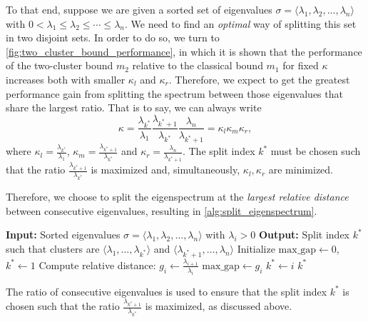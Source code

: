 To that end, suppose we are given a sorted set of eigenvalues $\sigma = \langle\lambda_1, \lambda_2, \ldots, \lambda_n\rangle$ with $0 < \lambda_1 \leq \lambda_2 \leq \cdots \leq \lambda_n$. We need to find an \textit{optimal} way of splitting this set in two disjoint sets. In order to do so, we turn to \cref{fig:two_cluster_bound_performance}, in which it is shown that the performance of the two-cluster bound $m_2$ relative to the classical bound $m_1$ for fixed $\kappa$ increases both with smaller $\kappa_l$ and $\kappa_r$. Therefore, we expect to get the greatest performance gain from splitting the spectrum between those eigenvalues that share the largest ratio. That is to say, we can always write
\[
    \kappa = \frac{\lambda_{k^*}}{\lambda_1}\frac{\lambda_{k^*+1}}{\lambda_{k^*}}\frac{\lambda_n}{\lambda_{k^*+1}} = \kappa_l\kappa_m\kappa_r,
\]
where $\kappa_l = \frac{\lambda_{k^*}}{\lambda_1}$, $\kappa_m = \frac{\lambda_{k^*+1}}{\lambda_{k^*}}$ and $\kappa_r = \frac{\lambda_n}{\lambda_{k^*+1}}$. The split index $k^*$ must be chosen such that the ratio $\frac{\lambda_{k^*+1}}{\lambda_{k^*}}$ is maximized and, simultaneously, $\kappa_l,\kappa_r$ are minimized.

Therefore, we choose to split the eigenspectrum at the \textit{largest relative distance} between consecutive eigenvalues, resulting in \cref{alg:split_eigenspectrum}.
\begin{algorithm}[H]
    \caption{$\operatorname{SplitEigenspectrum}(\sigma)$}
    \begin{algorithmic}[1]
        \State \textbf{Input:} Sorted eigenvalues $\sigma = \langle\lambda_1, \lambda_2, \ldots, \lambda_n\rangle$ with $\lambda_i > 0$
        \State \textbf{Output:} Split index $k^*$ such that clusters are $\langle\lambda_1, \ldots, \lambda_{k^*}\rangle$ and $\langle\lambda_{k^*+1}, \ldots, \lambda_n\rangle$
        \State Initialize $\text{max\_gap} \gets 0$, $k^* \gets 1$
        \State Compute relative distance: $g_i \gets \frac{\lambda_{i+1}}{\lambda_i}$
        \State $\text{max\_gap} \gets g_i$
        \EndIf
        \State $k^* \gets i$
        \EndFor
        \State \Return $k^*$
    \end{algorithmic}
    \label{alg:split_eigenspectrum}
\end{algorithm}
The ratio of consecutive eigenvalues is used to ensure that the split index $k^*$ is chosen such that the ratio $\frac{\lambda_{k^*+1}}{\lambda_{k^*}}$ is maximized, as discussed above.

